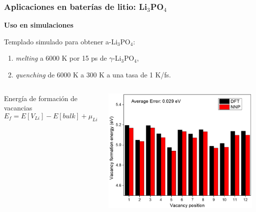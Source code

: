 \documentclass[aspectratio=169]{beamer}
\let\oldtextbf\textbf
\renewcommand{\textbf}[1]{\textcolor{nordblue}{\oldtextbf{#1}}}
\begin{document}
    \begin{frame}
        \frametitle{Aplicaciones en baterías de litio: Li$_3$PO$_4$}
         
        \textbf{Uso en simulaciones}

        Templado simulado para obtener a-Li$_3$PO$_4$:
        \begin{enumerate}
            \item \textit{melting} a 6000 K por 15 ps de $\gamma$-Li$_3$PO$_4$, 
            \item \textit{quenching} de 6000 K a 300 K a una tasa de 1 K/fs.
        \end{enumerate}

        \pause

        \begin{columns}
            Energía de formación de vacancias
            $$
            E_f = E[V_{Li}] - E[bulk] + \mu_{Li}
            $$

            \pause 

            \begin{center}
                \includegraphics[width=0.8\columnwidth]{Li3PO4-vacancias.png}
            \end{center}
        \end{columns}

    \end{frame}
    
\end{document}
